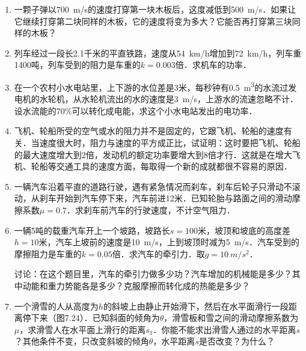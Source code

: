 \begin{exercises}
\begin{enumerate}
    \item  一颗子弹以\qty{700}{m/s}的速度打穿第一块木板后，这度减低到\qty{500}{m/s}．如果让它继续打穿第二块同样的木板，它的速度将变为多大？它能否再打穿第三块同样的木板？
    \item  列车经过一段长2.1千米的平直铁路，速度从\qty{54}{km/h}增加到\qty{72}{km/h}，列车重1400吨，列车受到的阻力是车重的$k=0.003$倍．求机车的功率．
    \item  在一个农村小水电站里，上下游的水位差是3米，每秒钟有\qty{0.5}{m^3}的水流过发电机的水轮机，从水轮机流出的水的速度是\qty{3}{m/s}，上游水的流速忽略不计．设水流能的70\%可以转化成电能，求这个小水电站发出的电功率．
    \item  飞机、轮船所受的空气或水的阻力并不是固定的，它跟飞机、轮船的速度有关．当速度很大时，阻力与速度的平方成正比，试证明：这时要把飞机、轮船的最大速度增大到2倍，发动机的额定功率要增大到8倍才行．这就是在增大飞机、轮船等交通工具的速度方面，每取得一个新的成就都很不容易的原因．
    \item 一辆汽车沿着平直的道路行驶，遇有紧急情况而刹车，刹车后轮子只滑动不滚动，从刹车开始到汽车停下来，汽车前进12米．已知轮胎与路面之间的滑动摩擦系数$\mu=0.7$．求刹车前汽车的行驶速度，不计空气阻力．
    \item 一辆5吨的载重汽车开上一个坡路，坡路长$s=100$米，坡顶和坡底的高度差$h=10$米，汽车上坡前的速度是\qty{10}{m/s}，上到坡顶时减为\qty{5}{m/s}．汽车受到的摩擦阻力是车重的$k=0.05$倍．求汽车的牵引力．取$g=\qty{10}{m/s^{2}}$．

          讨论：在这个题目里，汽车的牵引力做多少功？汽车增加的机械能是多少？其中动能和重力势能各是多少？克服摩擦而转化成的热能是多少？
    \item 一个滑雪的人从高度为$h$的斜坡上由静止开始滑下，然后在水平面滑行一段距离停下来（图7.24）．已知斜面的倾角为$\theta$，滑雪板和雪之间的滑动摩擦系数为$\mu$，求滑雪人在水平面上滑行的距离$s_1$．你能不能求出滑雪人通过的水平距离$s$？其他条件不变，只改变斜坡的倾角$\theta$，水平距离$s$是否改变？为什么？
          \begin{figure}[H]\centering
              \caption{}
          \end{figure}


\end{enumerate}
\end{exercises}
